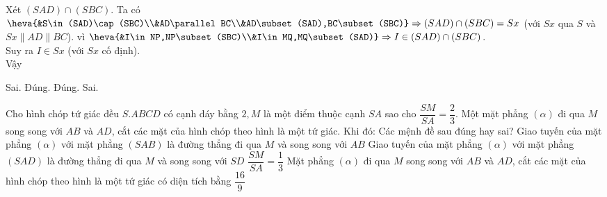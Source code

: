 \begin{ex}
{  Xét $(SAD)\cap  (SBC)$.
  Ta có $\heva{&S\in (SAD)\cap (SBC)\\&AD\parallel BC\\&AD\subset (SAD),BC\subset (SBC)}\Rightarrow (SAD)\cap (SBC)=Sx$ (với $Sx$ qua $S$ và $Sx\parallel AD\parallel BC$). vì $\heva{&I\in NP,NP\subset (SBC)\\&I\in MQ,MQ\subset (SAD)}\Rightarrow I\in (SAD)\cap  (SBC)$.\\
  Suy  ra $I\in Sx$ (với $Sx$ cố định).\\
   Vậy
  \begin{itemchoice}
   \itemch  Sai.
   \itemch Đúng. 
   \itemch Đúng. 
    \itemch Sai.
  \end{itemchoice}
 } 
\end{ex}

\begin{ex}%
 Cho hình chóp tứ giác đều $S.ABCD$ có cạnh đáy bằng $2,M$ là một điểm thuộc cạnh $SA$ sao cho $\dfrac{SM}{SA}=\dfrac{2}{3}$. Một mặt phẳng $(\alpha)$  đi qua $M$ song song với $AB$ và $AD$, cắt các mặt của hình chóp theo hình là một tứ giác. Khi đó:
  Các mệnh đề sau đúng hay sai?
  \choiceTF
  {\True Giao tuyến của mặt phẳng $(\alpha)$ với mặt phẳng $(SAB)$ là đường thẳng đi qua  $M$ và song song với $AB$}
  {Giao tuyến của mặt phẳng $(\alpha)$ với mặt phẳng $(SAD)$ là đường thẳng đi qua $M$ và song song với  $SD$}
  {$\dfrac{SM}{SA}=\dfrac{1}{3}$} 
  {\True Mặt phẳng $(\alpha)$ đi qua $M$ song song với $AB$ và $AD$, cắt các mặt của hình chóp theo hình là một tứ giác  có diện tích bằng $\dfrac{16}{9}$}
\end{ex}

